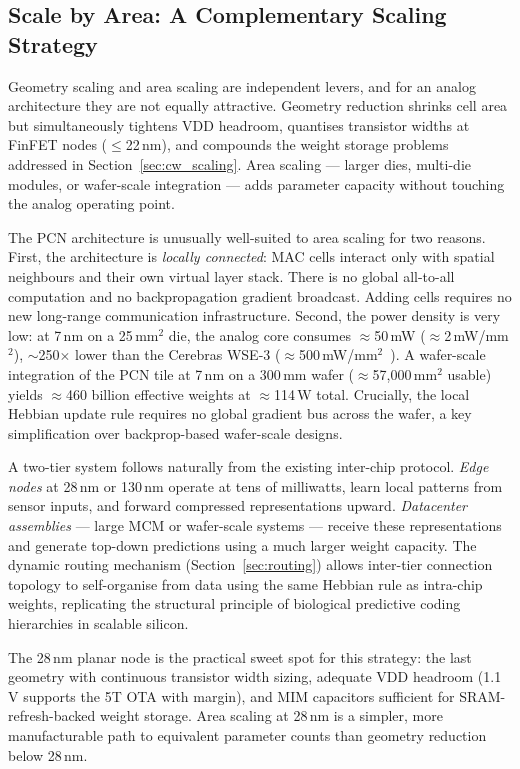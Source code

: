 \documentclass[journal,10pt,twoside]{IEEEtran}
\begin{document}
\subsection{Scale by Area: A Complementary Scaling Strategy}
\label{sec:area_scaling}

Geometry scaling and area scaling are independent levers, and for an analog
architecture they are not equally attractive.
Geometry reduction shrinks cell area but simultaneously tightens VDD headroom,
quantises transistor widths at FinFET nodes ($\leq$22\,nm), and compounds the
weight storage problems addressed in Section~\ref{sec:cw_scaling}.
Area scaling — larger dies, multi-die modules, or wafer-scale integration —
adds parameter capacity without touching the analog operating point.

The PCN architecture is unusually well-suited to area scaling for two reasons.
First, the architecture is \emph{locally connected}: MAC cells interact only
with spatial neighbours and their own virtual layer stack.
There is no global all-to-all computation and no backpropagation gradient
broadcast.
Adding cells requires no new long-range communication infrastructure.
Second, the power density is very low: at 7\,nm on a 25\,mm$^2$ die,
the analog core consumes $\approx$50\,mW ($\approx$2\,mW/mm$^2$),
$\sim$250$\times$ lower than the Cerebras WSE-3
($\approx$500\,mW/mm$^2$~\cite{cerebras2023wse3}).
A wafer-scale integration of the PCN tile at 7\,nm on a 300\,mm wafer
($\approx$57{,}000\,mm$^2$ usable) yields $\approx$460 billion effective
weights at $\approx$114\,W total.
Crucially, the local Hebbian update rule requires no global gradient bus
across the wafer, a key simplification over backprop-based wafer-scale designs.

A two-tier system follows naturally from the existing inter-chip protocol.
\emph{Edge nodes} at 28\,nm or 130\,nm operate at tens of milliwatts,
learn local patterns from sensor inputs, and forward compressed
representations upward.
\emph{Datacenter assemblies} — large MCM or wafer-scale systems — receive
these representations and generate top-down predictions using a much larger
weight capacity.
The dynamic routing mechanism (Section~\ref{sec:routing}) allows inter-tier
connection topology to self-organise from data using the same Hebbian rule
as intra-chip weights, replicating the structural principle of biological
predictive coding hierarchies in scalable silicon.

The 28\,nm planar node is the practical sweet spot for this strategy:
the last geometry with continuous transistor width sizing, adequate VDD
headroom (1.1\,V supports the 5T OTA with margin), and MIM capacitors
sufficient for SRAM-refresh-backed weight storage.
Area scaling at 28\,nm is a simpler, more manufacturable path to equivalent
parameter counts than geometry reduction below 28\,nm.
\end{document}
